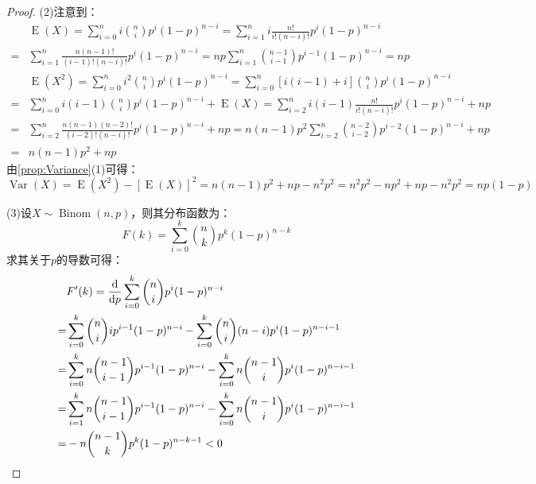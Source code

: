 \begin{proof}
	(2)注意到：
	\begin{align*}
		&\operatorname{E}(X)=\sum_{i=0}^{n}i\binom{n}{i}p^i(1-p)^{n-i}=\sum_{i=1}^{n}i\frac{n!}{i!(n-i)!}p^i(1-p)^{n-i} \\
		=&\sum_{i=1}^{n}\frac{n(n-1)!}{(i-1)!(n-i)!}p^i(1-p)^{n-i}=np\sum_{i=1}^{n}\binom{n-1}{i-1}p^{i-1}(1-p)^{n-i}=np \\
		&\operatorname{E}(X^2)=\sum_{i=0}^{n}i^2\binom{n}{i}p^i(1-p)^{n-i}=\sum_{i=0}^{n}[i(i-1)+i]\binom{n}{i}p^i(1-p)^{n-i} \\
		=&\sum_{i=0}^{n}i(i-1)\binom{n}{i}p^i(1-p)^{n-i}+\operatorname{E}(X)=\sum_{i=2}^{n}i(i-1)\frac{n!}{i!(n-i)!}p^i(1-p)^{n-i}+np \\
		=&\sum_{i=2}^{n}\frac{n(n-1)(n-2)!}{(i-2)!(n-i)!}p^i(1-p)^{n-i}+np=n(n-1)p^2\sum_{i=2}^{n}\binom{n-2}{i-2}p^{i-2}(1-p)^{n-i}+np \\
		=&n(n-1)p^2+np
	\end{align*}
	由\cref{prop:Variance}(1)可得：
	\begin{equation*}
		\operatorname{Var}(X)=\operatorname{E}(X^2)-[\operatorname{E}(X)]^2=n(n-1)p^2+np-n^2p^2=n^2p^2-np^2+np-n^2p^2=np(1-p)
	\end{equation*}\par
	(3)设$X\sim\operatorname{Binom}(n,p)$，则其分布函数为：
	\begin{equation*}
		F(k)=\sum_{i=0}^{k}\binom{n}{k}p^k(1-p)^{n-k}
	\end{equation*}
	求其关于$p$的导数可得：
	\begin{align*}
		&F'(k)=\frac{\mathop{}\!\mathrm{d}}{\mathop{}\!\mathrm{d} p}\sum_{i=0}^{k}\binom{n}{i}p^i(1-p)^{n-i} \\
		=&\sum_{i=0}^{k}\binom{n}{i}ip^{i-1}(1-p)^{n-i}-\sum_{i=0}^{k}\binom{n}{i}(n-i)p^i(1-p)^{n-i-1} \\
		=&\sum_{i=0}^{k}n\binom{n-1}{i-1}p^{i-1}(1-p)^{n-i}-\sum_{i=0}^{k}n\binom{n-1}{i}p^i(1-p)^{n-i-1} \\
		=&\sum_{i=1}^{k}n\binom{n-1}{i-1}p^{i-1}(1-p)^{n-i}-\sum_{i=0}^{k}n\binom{n-1}{i}p^i(1-p)^{n-i-1} \\
		=&-n\binom{n-1}{k}p^k(1-p)^{n-k-1}<0\qedhere
	\end{align*}
\end{proof}
